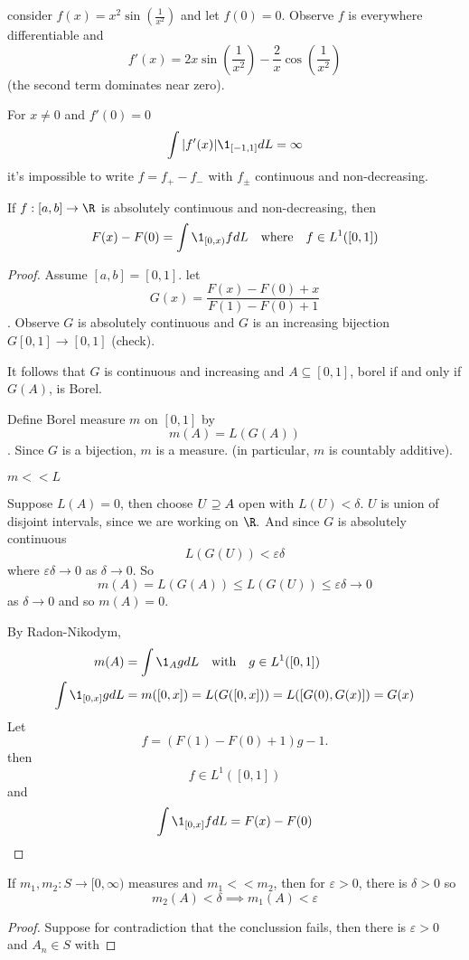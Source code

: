 \begin{example}
	consider $f(x) = x^{2} \sin(\frac{1}{x^2})$ and let $f(0) = 0$.
	Observe $f$ is everywhere differentiable and
	\[
		f'(x) = 2x \sin(\frac{1}{x^{2}}) - \frac{2}{x} \cos(\frac{1}{x^2})
	\] (the second term dominates near zero).

	For $x \neq 0$ and $f'(0) = 0$
	\[
		\int | f'(x) | \1_{[-1, 1]} dL = \infty
	\] 
	it's impossible to write $f = f_{+} - f_{-}$ with $f_{\pm}$ continuous and non-decreasing.
\end{example}


\begin{lemma}
	If $f : [a,b] \to \R$ is absolutely continuous and non-decreasing, then
	\begin{align*}
		F(x) - F(0) = \int \1_{[0,x)} f dL \quad \text{where} \quad f \in L^1 ([0,1])
	\end{align*} 
\end{lemma}

\begin{proof}
	Assume $[a,b] = [0,1]$.
	let
	 \[
		G(x) = \frac{F(x) - F(0) + x}{F(1) - F(0) + 1}
	\].
	Observe $G$ is absolutely continuous and $G$ is an increasing bijection $G [0,1] \to [0,1]$ (check).

	It follows that $G$ is continuous and increasing and $A \subseteq [0,1]$, borel if and only if $G(A)$, is Borel.

	Define Borel measure $m$ on $[0,1]$ by
	\[
		m(A) = L(G(A))
	\].
	Since $G$ is a bijection, $m$ is a measure. (in particular, $m$ is countably additive).
	\begin{claim}
		$m << L$
	\end{claim}
	Suppose $L(A) = 0$, then choose $U \supseteq A$ open with $L(U) < \delta$.
	$U$ is union of disjoint intervals, since we are working on $\R.$
	And since  $G$ is absolutely continuous
	\[
		L(G(U)) < \varepsilon \delta
	\] where $\varepsilon \delta \to 0$ as $\delta \to 0$.
	So 
	\[
		m(A) = L(G(A)) \leq L(G(U)) \leq \varepsilon \delta \to 0
	\] as $\delta \to 0$ and so $m(A) = 0$.

	By Radon-Nikodym,
	\begin{align*}
		m(A) &= \int \1_{A} g dL  \quad \text{with} \quad g \in L^1 ([0,1]) \\
		\int \1_{[0,x]} g dL &= m([0,x]) = L(G([0,x])) = L([G(0), G(x)]) = G(x)
	\end{align*} 
	Let
	\[
		f = (F(1) - F(0) + 1 ) g - 1.
	\]then
	\[
		f \in L^1([0,1])
	\] and
	\[
		\int \1_{[0,x]} f dL = F(x) - F(0)
	\] 
\end{proof}

\begin{lemma}
	If $m_1, m_2 : S \to [0, \infty)$ measures and 
	 $m_1 << m_2$, then for $\varepsilon > 0$, there is $\delta > 0$ so 
	 \[
	 	m_2(A) < \delta \implies m_1 (A) < \varepsilon
	 \] 
\end{lemma}

\begin{proof}
	Suppose for contradiction that the conclussion fails,
	then there is $\varepsilon > 0 $ and $A_n \in S$ with
\end{proof}




